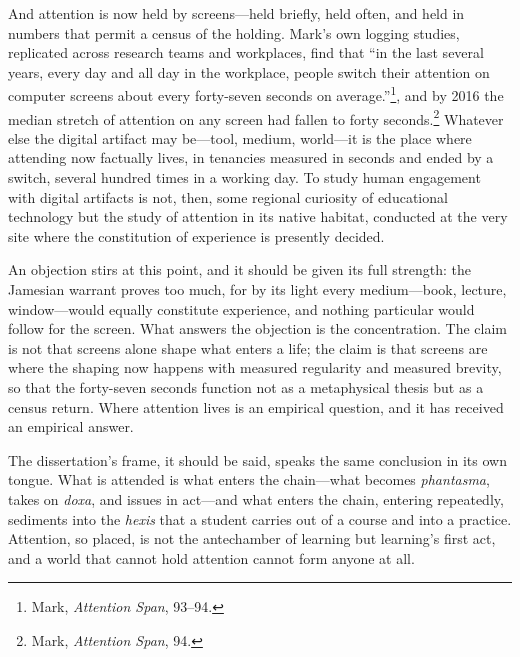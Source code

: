 And attention is now held by screens---held briefly, held often, and held in numbers that permit a census of the holding. Mark's own logging studies, replicated across research teams and workplaces, find that ``in the last several years, every day and all day in the workplace, people switch their attention on computer screens about every forty-seven seconds on average.''\footnote{Mark, \textit{Attention Span}, 93--94.}, and by 2016 the median stretch of attention on any screen had fallen to forty seconds.\footnote{Mark, \textit{Attention Span}, 94.} Whatever else the digital artifact may be---tool, medium, world---it is the place where attending now factually lives, in tenancies measured in seconds and ended by a switch, several hundred times in a working day. To study human engagement with digital artifacts is not, then, some regional curiosity of educational technology but the study of attention in its native habitat, conducted at the very site where the constitution of experience is presently decided.

An objection stirs at this point, and it should be given its full strength: the Jamesian warrant proves too much, for by its light every medium---book, lecture, window---would equally constitute experience, and nothing particular would follow for the screen. What answers the objection is the concentration. The claim is not that screens alone shape what enters a life; the claim is that screens are where the shaping now happens with measured regularity and measured brevity, so that the forty-seven seconds function not as a metaphysical thesis but as a census return. Where attention lives is an empirical question, and it has received an empirical answer.

The dissertation's frame, it should be said, speaks the same conclusion in its own tongue. What is attended is what enters the chain---what becomes \textit{phantasma}, takes on \textit{doxa}, and issues in act---and what enters the chain, entering repeatedly, sediments into the \textit{hexis} that a student carries out of a course and into a practice. Attention, so placed, is not the antechamber of learning but learning's first act, and a world that cannot hold attention cannot form anyone at all.

